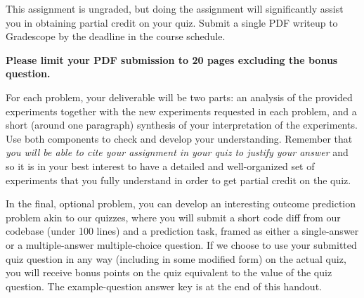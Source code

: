 \documentclass[11pt]{article}
\begin{document}
\worksheettitle
\begin{shadebox}[Instructions.]
  This assignment is ungraded, but doing the assignment will significantly assist you in obtaining partial credit on your quiz. Submit a single PDF writeup to Gradescope by the deadline in the course schedule.

  \textbf{Please limit your PDF submission to 20 pages excluding the bonus question.}

For each problem, your deliverable will be two parts: an analysis of the provided experiments together with the new experiments requested in each problem, and a short (around one paragraph) synthesis of your interpretation of the experiments. Use both components to check and develop your understanding. Remember that \emph{you will be able to cite your assignment in your quiz to justify your answer} and so it is in your best interest to have a detailed and well-organized set of experiments that you fully understand in order to get partial credit on the quiz.

In the final, optional problem, you can develop an interesting outcome prediction problem akin to our quizzes, where you will submit a short code diff from our codebase (under 100 lines) and a prediction task, framed as either a single-answer or a multiple-answer multiple-choice question. If we choose to use your submitted quiz question in any way (including in some modified form) on the actual quiz, you will receive bonus points on the quiz equivalent to the value of the quiz question.
The example-question answer key is at the end of this handout.
\end{shadebox}












\end{document}
